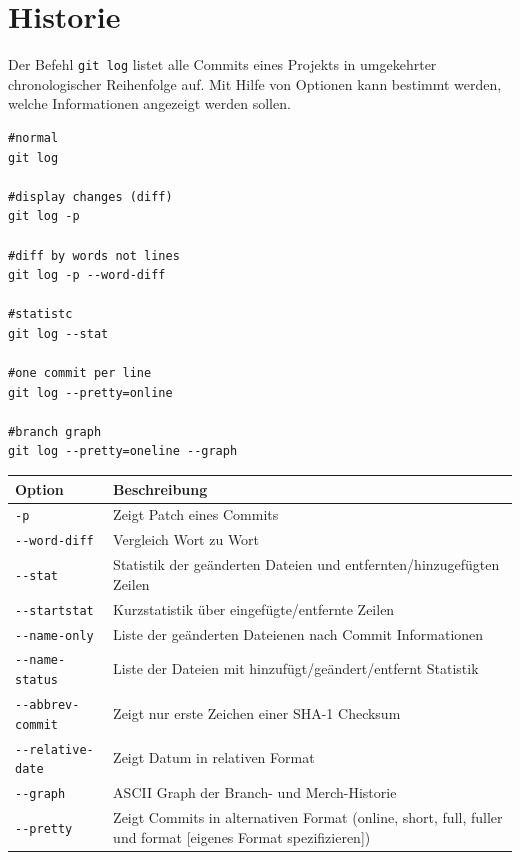\section{Historie}
Der Befehl \texttt{git log} listet alle Commits eines Projekts in umgekehrter chronologischer Reihenfolge auf. Mit Hilfe von Optionen kann bestimmt werden, welche Informationen angezeigt werden sollen.\\
\begin{lstlisting}[caption={Log},captionpos=b]
#normal
git log

#display changes (diff)
git log -p

#diff by words not lines
git log -p --word-diff

#statistc
git log --stat

#one commit per line
git log --pretty=online

#branch graph
git log --pretty=oneline --graph
\end{lstlisting}
\begin{center}
\renewcommand{\arraystretch}{1.2}
\begin{tabular}{|p{4cm}p{10cm}|}
\hline
\textbf{Option}				&\textbf{Beschreibung}\\
\hline
\texttt{-p}					&Zeigt Patch eines Commits\\
\hline
\texttt{-{}-word-diff}			&Vergleich Wort zu Wort\\
\hline
\texttt{-{}-stat}				&Statistik der geänderten Dateien und entfernten/hinzugefügten Zeilen\\
\hline
\texttt{-{}-startstat}			&Kurzstatistik über eingefügte/entfernte Zeilen\\
\hline
\texttt{-{}-name-only}			&Liste der geänderten Dateienen nach Commit Informationen\\
\hline
\texttt{-{}-name-status}		&Liste der Dateien mit hinzufügt/geändert/entfernt Statistik\\
\hline
\texttt{-{}-abbrev-commit}		&Zeigt nur erste Zeichen einer SHA-1 Checksum\\
\hline
\texttt{-{}-relative-date}		&Zeigt Datum in relativen Format\\
\hline
\texttt{-{}-graph}				&ASCII Graph der Branch- und Merch-Historie\\
\hline
\texttt{-{}-pretty}				&Zeigt Commits in alternativen Format (online, short, full, fuller und format [eigenes Format spezifizieren])\\
\hline
\end{tabular}
\renewcommand{\arraystretch}{1}
\end{center}
\newpage
